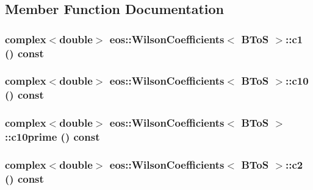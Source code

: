 \subsection{Member Function Documentation}
\hypertarget{structeos_1_1WilsonCoefficients_3_01BToS_01_4_a17759f6b63cf172d7d7f07dbbb78e3f9}{
\subsubsection[{c1}]{\setlength{\rightskip}{0pt plus 5cm}complex$<$double$>$ eos::WilsonCoefficients$<$ {\bf BToS} $>$::c1 () const}}
\label{structeos_1_1WilsonCoefficients_3_01BToS_01_4_a17759f6b63cf172d7d7f07dbbb78e3f9}
\hypertarget{structeos_1_1WilsonCoefficients_3_01BToS_01_4_a5a8db4cc5c486d0a77b968f1456446e3}{
\subsubsection[{c10}]{\setlength{\rightskip}{0pt plus 5cm}complex$<$double$>$ eos::WilsonCoefficients$<$ {\bf BToS} $>$::c10 () const}}
\label{structeos_1_1WilsonCoefficients_3_01BToS_01_4_a5a8db4cc5c486d0a77b968f1456446e3}
\hypertarget{structeos_1_1WilsonCoefficients_3_01BToS_01_4_a5afdd05acb7cd08196aa402ed6ccd374}{
\subsubsection[{c10prime}]{\setlength{\rightskip}{0pt plus 5cm}complex$<$double$>$ eos::WilsonCoefficients$<$ {\bf BToS} $>$::c10prime () const}}
\label{structeos_1_1WilsonCoefficients_3_01BToS_01_4_a5afdd05acb7cd08196aa402ed6ccd374}
\hypertarget{structeos_1_1WilsonCoefficients_3_01BToS_01_4_afcb665ee21ae1be28cec84c0a3781132}{
\subsubsection[{c2}]{\setlength{\rightskip}{0pt plus 5cm}complex$<$double$>$ eos::WilsonCoefficients$<$ {\bf BToS} $>$::c2 () const}}
